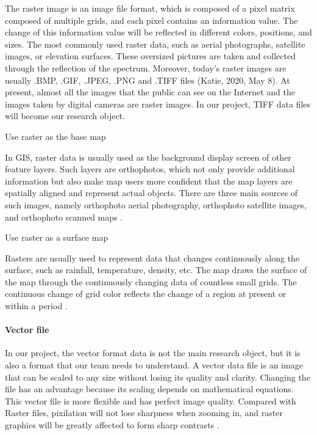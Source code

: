 \documentclass[conference]{IEEEtran}
\newcommand{\subparagraph}{}
\begin{document}
The raster image is an image file format, which is composed of a pixel matrix composed of multiple grids, and each pixel 
contains an information value. The change of this information value will be reflected in different colors, positions, and 
sizes. The most commonly used raster data, such as aerial photographs, satellite images, or elevation surfaces. These 
oversized pictures are taken and collected through the reflection of the spectrum. Moreover, today's raster images are 
usually .BMP, .GIF, .JPEG, .PNG and .TIFF files (Katie, 2020, May 8). At present, almost all the images that the public 
can see on the Internet and the images taken by digital cameras are raster images. In our project, TIFF data files will 
become our research object.

\subparagraph{Use raster as the base map}

In GIS, raster data is usually used as the background display screen of other feature layers. Such layers are orthophotos, 
which not only provide additional information but also make map users more confident that the map layers are spatially 
aligned and represent actual objects. There are three main sources of such images, namely orthophoto aerial photography, 
orthophoto satellite images, and orthophoto scanned maps \cite{decsktop15:online}.

\subparagraph{Use raster as a surface map}

Rasters are usually used to represent data that changes continuously along the surface, such as rainfall, temperature, 
density, etc. The map draws the surface of the map through the continuously changing data of countless small grids. The 
continuous change of grid color reflects the change of a region at present or within a period \cite{decsktop15:online}.

\paragraph{Vector file}

In our project, the vector format data is not the main research object, but it is also a format that our team needs 
to understand. A vector data file is an image that can be scaled to any size without losing its quality and clarity. 
Changing the file has an advantage because its scaling depends on mathematical equations. This vector file is more 
flexible and has perfect image quality. Compared with Raster files, pixilation will not lose sharpness when zooming 
in, and raster graphics will be greatly affected to form sharp contrasts \cite{Thepaged34:online}.
\end{document}
